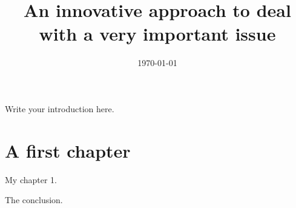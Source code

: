 \documentclass{gsemthesis}
\title{An innovative approach to deal with a very important issue}
\date{\today}
\begin{document}
\printcoverpage

\printfrontmatter

\startintroduction 

Write your introduction here.

\chapter{A first chapter}
\label{ch:chapterone}

My chapter 1.

\startconclusion

The conclusion.

\listoftables
\listoffigures

\newpage
\printbibliography
\end{document}
